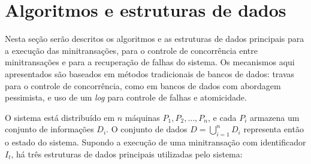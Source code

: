 \documentclass[11pt,twoside,a4paper]{book}
\begin{document}
\section{Algoritmos e estruturas de dados}
\label{sec:algoritmos}
Nesta seção serão descritos os algoritmos e as estruturas de dados principais para a execução das minitransações, para o controle de concorrência entre minitransações e para a recuperação de falhas do sistema. Os mecanismos aqui apresentados são baseados em métodos tradicionais de bancos de dados: travas para o controle de concorrência, como em bancos de dados com abordagem pessimista, e uso de um \emph{log} para controle de falhas e atomicidade.

O sistema está distribuído em $n$ máquinas $P_1, P_2, \dotsc, P_n$, e cada $P_i$ armazena um conjunto de informações $D_i$. O conjunto de dados $D = \bigcup_{i=1}^n D_i$ representa então o estado do sistema. Supondo a execução de uma minitransação com identificador \(I_t\), há três estruturas de dados principais utilizadas pelo sistema:
\end{document}
